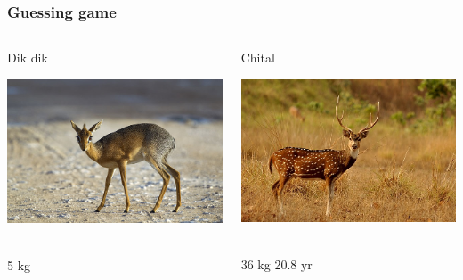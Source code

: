 \documentclass{beamer}
\begin{document}
\begin{frame}
  \frametitle{Guessing game}
  \begin{columns}[c]
     \begin{block}{Dik dik}
      \begin{center}
        \includegraphics[height=.25\textheight]{640px-Madoqua_kirkii_-_female_(Namutoni).jpg}\
      \end{center}
      5 kg
    \end{block}
    
     \begin{block}{Chital}
      \begin{center}
        \includegraphics[height=.25\textheight]{640px-A_chital_stag_1.jpg}\
      \end{center}
      36 kg  \hfill 20.8 yr
    \end{block}


\end{columns}
\end{frame}
\end{document}
